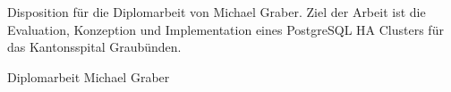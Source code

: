 \documentclass{ibw_disposition}
\begin{document}

    \maketitle
    \clearpage
    \thispagestyle{fancy}
    \begin{zusammenfassung}
        Disposition für die Diplomarbeit von Michael Graber.
        Ziel der Arbeit ist die Evaluation, Konzeption und Implementation eines PostgreSQL HA Clusters für das Kantonsspital Graubünden.
    \end{zusammenfassung}
    \pagestyle{headings}
    \thispagestyle{fancy}

    \begin{managementsummary}
        \begin{flushleft}
            Diplomarbeit Michael Graber
        \end{flushleft}
    \end{managementsummary}

    \clearpage
    {
        \hypersetup{hidelinks}
        \tableofcontents
    }
    \pagestyle{headings}
    \thispagestyle{fancy}
%    
    \startThesis %
    
    
    
    
    
\end{document}
